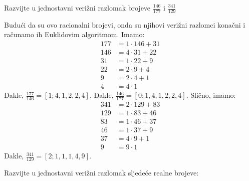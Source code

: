 \documentclass{exam}
\begin{document}
\begin{questions}
\pagebreak

\question Razvijte u jednostavni verižni razlomak brojeve $\displaystyle \frac{146}{177}$ i $\displaystyle \frac{341}{129}$

\begin{solution}
  Budući da su ovo racionalni brojevi, onda su njihovi verižni razlomci konačni i računamo ih Euklidovim algoritmom. Imamo:
  \begin{align*}
    177 &= 1 \cdot 146 + 31\\
    146 &= 4 \cdot 31 + 22\\
    31 &= 1 \cdot 22 + 9\\
    22 &= 2 \cdot 9 + 4\\
    9 &= 2 \cdot 4 + 1\\
    4 &= 4 \cdot 1
  \end{align*}
  Dakle, $\frac{177}{146} = [1; 4, 1, 2, 2, 4]$. Dakle, $\frac{146}{177} = [0; 1, 4, 1, 2, 2, 4]$. Slično, imamo:
  \begin{align*}
    341 &= 2 \cdot 129 + 83\\
    129 &= 1 \cdot 83 + 46\\
    83 &= 1 \cdot 46 + 37\\
    46 &= 1 \cdot 37 + 9\\
    37 &= 4 \cdot 9 + 1\\
    9 &= 9 \cdot 1
  \end{align*}
  Dakle, $\frac{341}{129} = [2; 1, 1, 1, 4, 9]$.
\end{solution}

\question Razvijte u jednostavni verižni razlomak sljedeće realne brojeve:


\end{questions}
\end{document}
